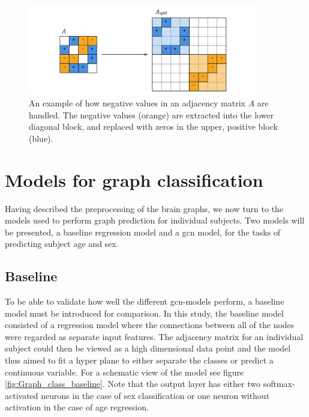 \begin{figure}[!htbp]
    \centering
    \includegraphics[width=0.9\textwidth]{chapters/images_methods/split.png}
    \caption{An example of how negative values in an adjacency matrix $A$ are handled. The negative values (orange) are extracted into the lower diagonal block, and replaced with zeros in the upper, positive block (blue).}
    \label{fig:block_diagonal_adjacency_matrix}
\end{figure}

\section{Models for graph classification}

Having described the preprocessing of the brain graphs, we now turn to the models used to perform graph prediction for individual subjects. Two models will be presented, a baseline regression model and a \acrshort{gcn} model, for the tasks of predicting subject age and sex.

\subsection{Baseline}
To be able to validate how well the different \acrshort{gcn}-models perform, a baseline model must be introduced for comparison. In this study, the baseline model consisted of a regression model where the connections between all of the nodes were regarded as separate input features. The adjacency matrix for an individual subject could then be viewed as a high dimensional data point and the model thus aimed to fit a hyper plane to either separate the classes or predict a continuous variable. For a schematic view of the model see figure \ref{fig:Graph_class_baseline}. Note that the output layer has either two softmax-activated neurons in the case of sex classification or one neuron without activation in the case of age regression. 

